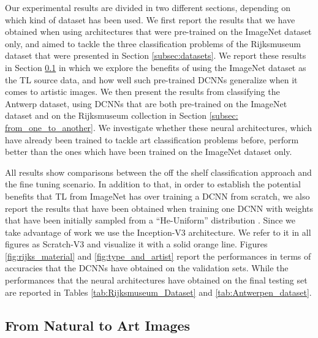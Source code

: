 \documentclass[runningheads]{llncs}
\begin{document}
Our experimental results are divided in two different sections, depending on which kind of dataset has been used. We first report the results that we have obtained when using architectures that were pre-trained on the ImageNet dataset only, and aimed to tackle the three classification problems of the Rijksmuseum dataset that were presented in Section \ref{subsec:datasets}. We report these results in Section \ref{subsec: natural_to_art} in which we explore the benefits of using the ImageNet dataset as the TL source data, and how well such pre-trained DCNNs generalize when it comes to artistic images. We then present the results from classifying the Antwerp dataset, using DCNNs that are both pre-trained on the ImageNet dataset and on the Rijksmuseum collection in Section \ref{subsec: from_one_to_another}. We investigate whether these neural architectures, which have already been trained to tackle art classification problems before, perform better than the ones which have been trained on the ImageNet dataset only.    

All results show comparisons between the off the shelf classification approach and the fine tuning scenario. In addition to that, in order to establish the potential benefits that TL from ImageNet has over training a DCNN from scratch, we also report the results that have been obtained when training one DCNN with weights that have been initially sampled from a ``He-Uniform'' distribution \cite{he2015delving}. Since we take advantage of work \cite{bidoiadeep} we use the Inception-V3 architecture. We refer to it in all figures as Scratch-V3 and visualize it with a solid orange line. Figures \ref{fig:rijks_material} and \ref{fig:type_and_artist} report the performances in terms of accuracies that the DCNNs have obtained on the validation sets. While the performances that the neural architectures have obtained on the final testing set are reported in Tables \ref{tab:Rijksmuseum_Dataset} and \ref{tab:Antwerpen_dataset}. 


\subsection{From Natural to Art Images}
\label{subsec: natural_to_art}
\end{document}
